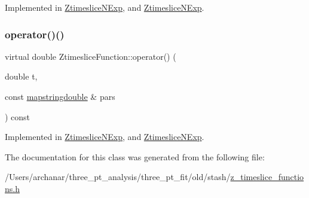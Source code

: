 Implemented in \mbox{\hyperlink{classZtimesliceNExp_a8d550e27c4abc64a0498b224259863b7}{Ztimeslice\+N\+Exp}}, and \mbox{\hyperlink{classZtimesliceNExp_a8d550e27c4abc64a0498b224259863b7}{Ztimeslice\+N\+Exp}}.

\mbox{\label{classZtimesliceFunction_aee3aaf0215deb7e33e609a3d227c28d5}} 
\subsubsection{\texorpdfstring{operator()()}{operator()()}\hspace{0.1cm}{\footnotesize\ttfamily [4/4]}}
{\footnotesize\ttfamily virtual double Ztimeslice\+Function\+::operator() (\begin{DoxyParamCaption}\item[{double}]{t,  }\item[{const \mbox{\hyperlink{lib_2fitting__lib_2includes_8h_a647b481c557c7966517f753340a81d13}{mapstringdouble}} \&}]{pars }\end{DoxyParamCaption}) const\hspace{0.3cm}{\ttfamily [pure virtual]}}



Implemented in \mbox{\hyperlink{classZtimesliceNExp_a8d550e27c4abc64a0498b224259863b7}{Ztimeslice\+N\+Exp}}, and \mbox{\hyperlink{classZtimesliceNExp_a8d550e27c4abc64a0498b224259863b7}{Ztimeslice\+N\+Exp}}.



The documentation for this class was generated from the following file\+:\begin{DoxyCompactItemize}
\item 
/\+Users/archanar/three\+\_\+pt\+\_\+analysis/three\+\_\+pt\+\_\+fit/old/stash/\mbox{\hyperlink{old_2stash_2z__timeslice__functions_8h}{z\+\_\+timeslice\+\_\+functions.\+h}}\end{DoxyCompactItemize}
